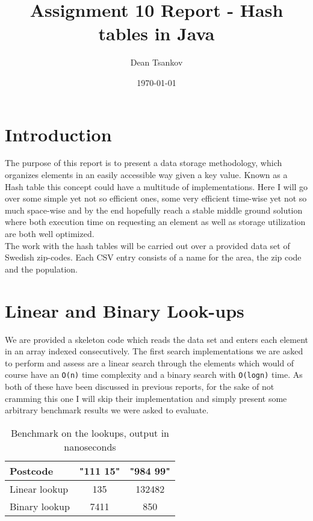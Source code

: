 \documentclass[a4paper,11pt]{article}
\begin{document}
\title{
    \textbf{Assignment 10 Report - Hash tables in Java}
}
\author{Dean Tsankov}
\date{\today}

\maketitle

\section*{Introduction}

The purpose of this report is to present a data storage methodology, which organizes elements in an easily accessible way given a key value. Known as a Hash table this concept could have a multitude of implementations. Here I will go over some simple yet not so efficient ones, some very efficient time-wise yet not so much space-wise and by the end hopefully reach a stable middle ground solution where both execution time on requesting an element as well as storage utilization are both well optimized.
\\

The work with the hash tables will be carried out over a provided data set of Swedish zip-codes. Each CSV entry consists of a name for the area, the zip code and the population.

\section*{Linear and Binary Look-ups}

We are provided a skeleton code which reads the data set and enters each element in an array indexed consecutively. The first search implementations we are asked to perform and assess are a linear search through the elements which would of course have an {\tt O(n)} time complexity and a binary search with {\tt O(logn)} time. As both of these have been discussed in previous reports, for the sake of not cramming this one I will skip their implementation and simply present some arbitrary benchmark results we were asked to evaluate.


\begin{table}[H]
\begin{center}
\begin{tabular}{l|c|c}
\textbf{Postcode} & \textbf{"111 15"} & \textbf{"984 99"}\\
\hline
  Linear lookup      &  135 &     132482 \\
  Binary lookup       &  7411 &    850 \\
\end{tabular}
\caption{Benchmark on the lookups, output in nanoseconds}
\label{tab:table1}
\end{center}
\end{table}
\end{document}
